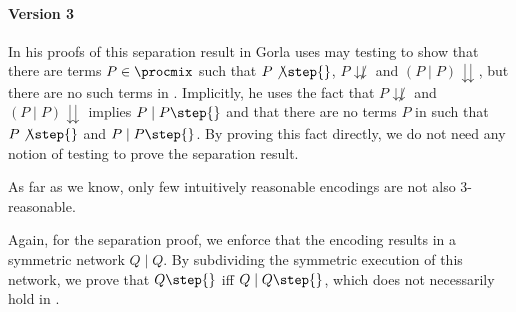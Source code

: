 \documentclass[11pt,techReport]{eptcs}
\begin{document}
\paragraph{Version 3}

In his proofs of this separation result in \cite{gorla08d} Gorla uses may testing to show that there are terms $ P \in \procmix $ such that $ P \not\step{} $, $ P \not\downdownarrows $ and $ \left( P \mid P \right) \downdownarrows $, but there are no such terms in \procsep. Implicitly, he uses the fact that $ P \not\downdownarrows $ and $ \left( P \mid P \right) \downdownarrows $ implies $ P \mid P \step{} $ and that there are no terms $ P $ in \procsep such that $ P \not\step{} $ and $ P \mid P \step{} $. By proving this fact directly, we do not need any notion of testing to prove the separation result.


As far as we know, only few intuitively reasonable encodings are not also 3-reasonable.

Again, for the separation proof, we enforce that the encoding results in a symmetric network $ Q \mid Q $. By subdividing the symmetric execution of this network, we prove that $ Q \step{} $ iff $ Q \mid Q \step{} $, which does not necessarily hold in \pimix.
\end{document}
